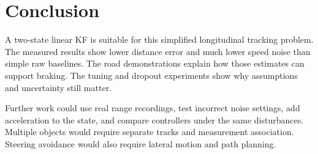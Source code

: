 \documentclass[11pt,a4paper]{article}
\begin{document}
\clearpage\section{Conclusion}
A two-state linear KF is suitable for this simplified longitudinal tracking problem. The measured results show lower distance error and much lower speed noise than simple raw baselines. The road demonstrations explain how those estimates can support braking. The tuning and dropout experiments show why assumptions and uncertainty still matter.\par

Further work could use real range recordings, test incorrect noise settings, add acceleration to the state, and compare controllers under the same disturbances. Multiple objects would require separate tracks and measurement association. Steering avoidance would also require lateral motion and path planning.\par
\end{document}
